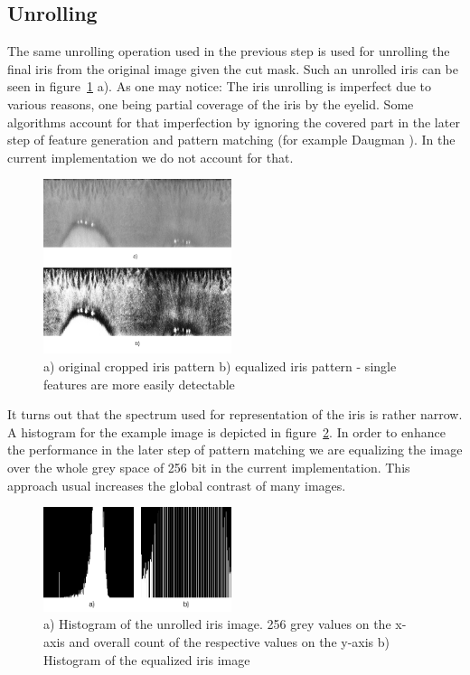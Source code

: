 \documentclass[journal]{IEEEtran}
\begin{document}
\subsection{Unrolling}
The same unrolling operation used in the previous step is used for unrolling the final iris from the original image given the cut mask. Such an unrolled iris can be seen in figure~\ref{fig:unrolled_iris} a). As one may notice: The iris unrolling is imperfect due to various reasons, one being partial coverage of the iris by the eyelid. Some algorithms account for that imperfection by ignoring the covered part in the later step of feature generation and pattern matching (for example Daugman \cite{4305270}). In the current implementation we do not account for that. 
\begin{figure}[ht]
	\centering
  \includegraphics[width=0.49\textwidth]{iris/iris_unrolled.png}
	\caption{a) original cropped iris pattern b) equalized iris pattern - single features are more easily detectable}
	\label{fig:unrolled_iris}
\end{figure}
\par It turns out that the spectrum used for representation of the iris is rather narrow. A histogram for the example image is depicted in figure~\ref{fig:histogram}. In order to enhance the performance in the later step of pattern matching we are equalizing the image over the whole grey space of 256 bit in the current implementation. This approach usual increases the global contrast of many images.
\begin{figure}[h]
	\centering
  \includegraphics[width=0.49\textwidth]{iris/iris_histo.png}
	\caption{a) Histogram of the unrolled iris image. 256 grey values on the x-axis and overall count of the respective values on the y-axis b) Histogram of the equalized iris image}
	\label{fig:histogram}
\end{figure}
\end{document}

